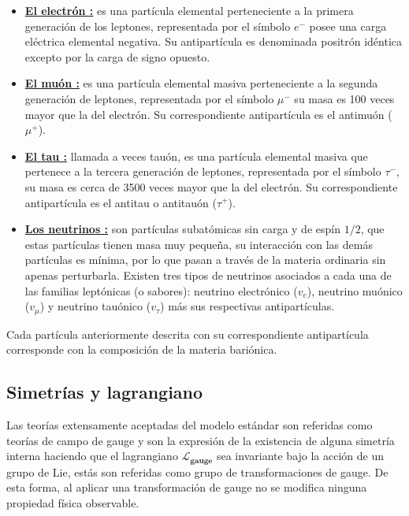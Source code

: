 \begin{itemize}
    \item \href{https://es.wikipedia.org/wiki/Electr\%C3\%B3n}{\textbf{El electrón :}} es una partícula elemental perteneciente a la primera generación de los leptones, representada por el símbolo $e^-$ posee una carga eléctrica elemental negativa. Su antipartícula es denominada positrón idéntica excepto por la carga de signo opuesto.
    
    \item \href{https://es.wikipedia.org/wiki/Muon}{\textbf{El muón :}} 
     es una partícula elemental masiva perteneciente a la segunda generación de leptones, representada por el símbolo $\mu^-$ su masa es 100 veces mayor que la del electrón. Su correspondiente antipartícula es el antimuón ($\mu^+$).
    
    \item \href{https://es.wikipedia.org/wiki/Tau_(part\%C3\%ADcula)}{\textbf{El tau :}} llamada a veces tauón, es una partícula elemental masiva que pertenece a la tercera generación de leptones, representada por el símbolo $\tau^-$, su masa es cerca de 3500 veces mayor que la del electrón. Su correspondiente antipartícula es el antitau o antitauón ($\tau^+$).
    
    \item \href{https://es.wikipedia.org/wiki/Neutrino}{\textbf{Los neutrinos :}}
    son partículas subatómicas sin carga y de espín $1/2$, que estas partículas tienen masa muy pequeña, su interacción con las demás partículas es mínima, por lo que pasan a través de la materia ordinaria sin apenas perturbarla. Existen tres tipos de neutrinos asociados a cada una de las familias leptónicas (o sabores): neutrino electrónico ($v_e$), neutrino muónico ($v_\mu$) y neutrino tauónico ($v_\tau$) más sus respectivas antipartículas.

\end{itemize}

Cada partícula anteriormente descrita con su correspondiente antipartícula corresponde con la composición de la materia bariónica.


\subsection{Simetrías y lagrangiano} 


Las teorías extensamente aceptadas del modelo estándar son referidas como teorías de campo de gauge y son la expresión de la existencia de alguna simetría interna haciendo que el lagrangiano $\mathcal{L}_{\mathbf{gauge}}$ sea invariante bajo la acción de un grupo de Lie, estás son referidas como grupo de transformaciones de gauge. De esta forma, al aplicar una transformación de gauge no se modifica ninguna propiedad física observable.

